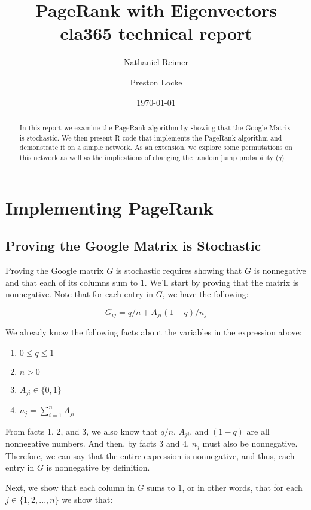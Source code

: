 \documentclass{article}
\title{{\sffamily PageRank with Eigenvectors} \\ 
{\sc cla365 technical report }}
\author{Nathaniel Reimer \and Preston Locke}
\date{\today}
\begin{document}
\maketitle

\begin{abstract} 
\noindent
In this report we examine the PageRank algorithm by showing that the Google Matrix is stochastic. We then present R code that implements the PageRank algorithm and demonstrate it on a simple network. As an extension, we explore some permutations on this network as well as the implications of changing the random jump probability ($q$)
\end{abstract}


\section{Implementing PageRank}

\subsection{Proving the Google Matrix is Stochastic}


Proving the Google matrix $G$ is stochastic requires showing that $G$ is nonnegative
and that each of its columns sum to $1$. We'll start by proving that the matrix is
nonnegative. Note that for each entry in $G$, we have the following:

$$
G_{ij} = q/n + A_{ji} (1 - q) / n_j
$$

We already know the following facts about the variables in the expression above:

\begin{enumerate}
    \item $0 \leq q \leq 1$
    \item $n > 0$
    \item $A_{ji} \in \{0,1\}$
    \item $n_j = \sum_{i=1}^n A_{ji}$
\end{enumerate}

From facts 1, 2, and 3, we also know that $q/n$, $A_{ji}$, and $(1 - q)$ are all
nonnegative numbers. And then, by facts 3 and 4, $n_j$ must also be nonnegative. Therefore,
we can say that the entire expression is nonnegative, and thus, each entry in $G$ is
nonnegative by definition.

Next, we show that each column in $G$ sums to $1$, or in other words, that for each
$j \in \{ 1, 2, ..., n\}$ we show that:
\end{document}
